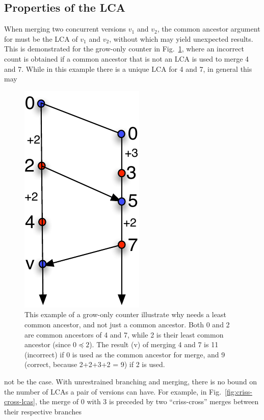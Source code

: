 \subsection{Properties of the LCA}

When merging two concurrent versions $v_1$ and $v_2$, the common
ancestor argument for  must be the LCA of $v_1$ and $v_2$,
without which  may yield unexpected results. This is
demonstrated for the grow-only counter in
Fig.~\ref{fig:merge-needs-lca}, where an incorrect count is obtained if a
common ancestor that is not an LCA is used to merge 4 and 7. While in
this example there is a unique LCA for 4 and 7, in general this may
\begin{figure}
\centering
\includegraphics[scale=0.6]{Figures/merge-needs-lca}
\caption{This example of a grow-only counter illustrate why 
needs a least common ancestor, and not just a common ancestor. Both 0
and 2 are common ancestors of 4 and 7, while 2 is their least common
ancestor (since $0 \preceq 2$). The result (v) of merging 4 and 7 is
11 (incorrect) if 0 is used as the common ancestor for merge, and 9
(correct, because 2+2+3+2 = 9) if 2 is used. }
\label{fig:merge-needs-lca}
\end{figure}
not be the case. With unrestrained branching and merging, there is no
bound on the number of LCAs a pair of versions can have.  For example,
in Fig.~\ref{fig:criss-cross-lcas}, the merge of 0 with 3 is preceded
by two ``criss-cross'' merges between their respective branches

